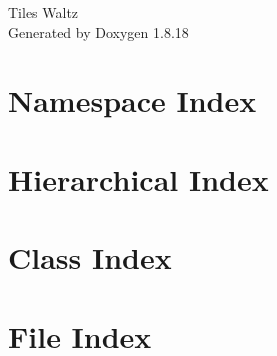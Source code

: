 \let\mypdfximage\pdfximage\def\pdfximage{\immediate\mypdfximage}\documentclass[twoside]{book}
\newcommand{\+}{\discretionary{\mbox{\scriptsize$\hookleftarrow$}}{}{}}
\newcommand{\clearemptydoublepage}{%
  \newpage{\pagestyle{empty}\cleardoublepage}%
}
\begin{document}
\hypersetup{pageanchor=false,
             bookmarksnumbered=true,
             pdfencoding=unicode
            }
\begin{titlepage}
\vspace*{7cm}
\begin{center}%
{\Large Tile\textquotesingle{}s Waltz }\\
\vspace*{1cm}
{\large Generated by Doxygen 1.8.18}\\
\end{center}
\end{titlepage}
\clearemptydoublepage
{}
\tableofcontents
\clearemptydoublepage
{}
\hypersetup{pageanchor=true}

\chapter{Namespace Index}

\chapter{Hierarchical Index}

\chapter{Class Index}

\chapter{File Index}

\end{document}
